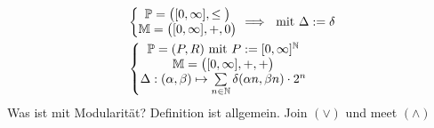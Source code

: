 \begin{beispiel}
\begin{align*}
&\left\lbrace\begin{matrix}
\mathbb{P}=\big([0,\infty],\leq\big)\\
\mathbb{M}=\big([0,\infty],+,0\big)
\end{matrix}\right.\implies \text{ mit }\Delta:=\delta\\
&\left\lbrace\begin{matrix}
\mathbb{P}=(P,R)\text{ mit } P:=[0,\infty]^{\mathbb{N}}\\
\mathbb{M}=\big([0,\infty],+,+\big)\\
\Delta:(\alpha,\beta)\mapsto\sum\limits_{n\in\mathbb{N}}\delta(\alpha n,\beta n)\cdot 2^n
\end{matrix}\right.
\end{align*}
Was ist mit Modularität? Definition ist allgemein. Join $(\vee)$ und meet $(\wedge)$
\end{beispiel}

